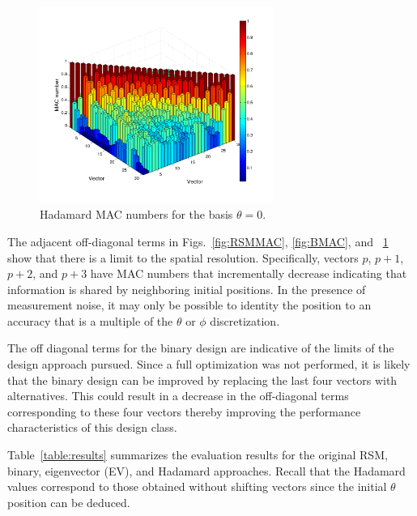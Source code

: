 \documentclass[3p,times]{elsarticle}
\begin{document}
\begin{figure}[ht!]
\includegraphics[width={3.0in}]{../figs/HadMAC.pdf}
\centering
\caption{Hadamard MAC numbers for the basis $\theta=0$.}
\label{fig:HadMAC}
\end{figure}

The adjacent off-diagonal terms in Figs.~\ref{fig:RSMMAC}, \ref{fig:BMAC}, and ~\ref{fig:HadMAC} show that there is a limit to the spatial resolution.  
Specifically, vectors $p$, $p+1$, $p+2$, and $p+3$ have MAC numbers that incrementally decrease indicating that information is shared by neighboring initial positions.  
In the presence of measurement noise, it may only be possible to identity the position to an accuracy that is a multiple of the $\theta$ or $\phi$ discretization.

The off diagonal terms for the binary design are indicative of the limits of the design approach pursued.  
Since a full optimization was not performed, it is likely that the binary design can be improved by replacing the last four vectors with alternatives. 
This could result in a decrease in the off-diagonal terms corresponding to these four vectors thereby improving the performance characteristics of this design class.

Table~\ref{table:results} summarizes the evaluation results for the original RSM, binary, eigenvector (EV), and Hadamard approaches.  
Recall that the Hadamard values correspond to those obtained without shifting vectors since the initial $\theta$ position can be deduced.
\end{document}
